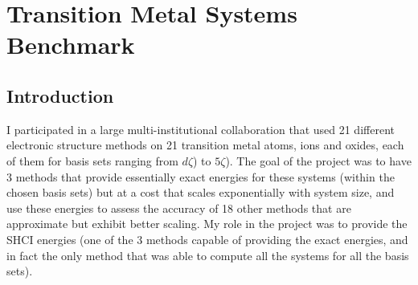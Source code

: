 \chapter{Transition Metal Systems Benchmark}
\label{ch:benchmark}
\section{Introduction}
I participated in a large multi-institutional collaboration that used 21 different electronic structure methods
on 21 transition metal atoms, ions and oxides, each of them for basis sets ranging from $d\zeta$) to $5\zeta$).
The goal of the project was to have 3 methods that provide essentially exact energies for these systems
(within the chosen basis sets) but at a cost that scales exponentially with system size, and use these
energies to assess the accuracy of 18 other methods that are approximate but exhibit better scaling.
My role in the project was to provide the SHCI energies (one of the 3 methods capable of providing the
exact energies, and in fact the only method that was able to compute all the systems for all the basis sets).

%


